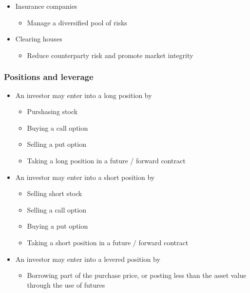 \documentclass[../notes_compiled.tex]{subfiles}
\begin{document}
\begin{itemize}
\begin{itemize}
\item Insurance companies
\begin{itemize}
\item Manage a diversified pool of risks
\end{itemize}

\item Clearing houses
\begin{itemize}
\item Reduce counterparty risk and promote market integrity
\end{itemize}

\end{itemize}

\end{itemize}


\subsubsection{Positions and leverage}

\begin{itemize}
\item An investor may enter into a long position by
\begin{itemize}
\item Purshasing stock
\item Buying a call option
\item Selling a put option
\item Taking a long position in a future / forward contract
\end{itemize}

\item An investor may enter into a short position by
\begin{itemize}
\item Selling short stock
\item Selling a call option
\item Buying a put option
\item Taking a short position in a future / forward contract
\end{itemize}

\item An investor may enter into a levered position by
\begin{itemize}
\item Borrowing part of the purchase price, or posting less than the asset value through the use of futures
\end{itemize}

\end{itemize}
\end{document}
